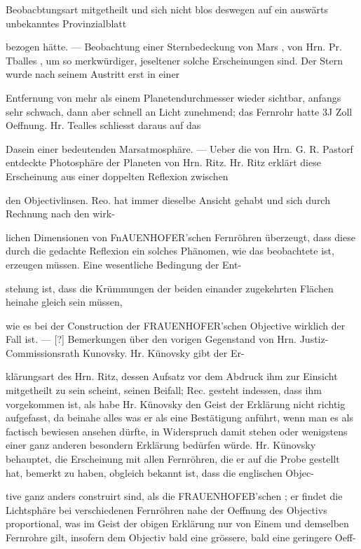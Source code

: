 \documentclass[10pt,a4paper]{article}
\begin{document}
Beobacbtungsart mitgetheilt und sich nicht blos deswegen auf ein auswärts unbekanntes Provinzialblatt

bezogen hätte. — Beobachtung einer Sternbedeckung von Mars , von Hrn. Pr. Tballes , um so merkwürdiger, jeseltener solche Erscheinungen sind. Der Stern wurde nach seinem Austritt erst in einer

Entfernung von mehr als einem Planetendurchmesser wieder sichtbar, anfangs sehr schwach, dann aber schnell an Licht zunehmend; das Fernrohr hatte 3J Zoll Oeffnung. Hr. Tealles schliesst daraus auf das

Dasein einer bedeutenden Marsatmosphäre. — Ueber die von Hrn. G. R. Pastorf entdeckte Photosphäre der Planeten von Hrn. Ritz. Hr. Ritz erklärt diese Erscheinung aus einer doppelten Reflexion zwischen

den Objectivlinsen. Reo. hat immer dieselbe Ansicht gehabt und sich durch Rechnung nach den wirk-

lichen Dimensionen von FnAUENHOFER'schen Fernröhren überzeugt, dass diese durch die gedachte Reflexion ein solches Phänomen, wie das beobachtete ist, erzeugen müssen. Eine wesentliche Bedingung der Ent-

stehung ist, dass die Krümmungen der beiden einander zugekehrten Flächen heinahe gleich sein müssen,

wie es bei der Construction der FRAUENHOFER'schen Objective wirklich der Fall ist. — [?] Bemerkungen über den vorigen Gegenstand von Hrn. Justiz-Commissionsrath Kunovsky. Hr. Künovsky gibt der Er-

klärungsart des Hrn. Ritz, dessen Aufsatz vor dem Abdruck ihm zur Einsicht mitgetheilt zu sein scheint, seinen Beifall; Rec. gesteht indessen, dass ihm vorgekommen ist, als habe Hr. Künovsky den Geist der Erklärung nicht richtig aufgefasst, da beinahe alles was er als eine Bestätigung anführt, wenn man es als factisch bewiesen ansehen dürfte, in Widerspruch damit stehen oder wenigstens einer ganz anderen besondern Erklärung bedürfen würde. Hr. Künovsky behauptet, die Erscheinung mit allen Fernröhren, die er auf die Probe gestellt hat, bemerkt zu haben, obgleich bekannt ist, dass die englischen Objec-

tive ganz anders construirt sind, als die FRAUENHOFEB'schen ; er findet die Lichtsphäre bei verschiedenen Fernröhren nahe der Oeffnung des Objectivs proportional, was im Geist der obigen Erklärung nur von Einem und demselben Fernrohre gilt, insofern dem Objectiv bald eine grössere, bald eine geringere Oeff-
\end{document}
